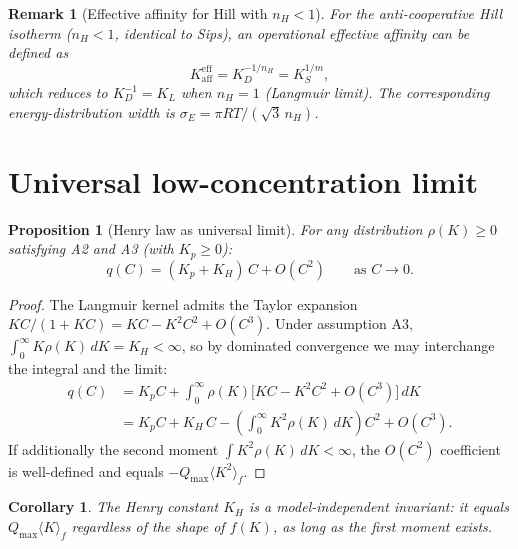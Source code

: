 \documentclass[12pt]{article}
\newtheorem{proposition}{Proposition}
\newtheorem{corollary}{Corollary}
\newtheorem{remark}{Remark}
\begin{document}
\begin{remark}[Effective affinity for Hill with $n_H < 1$]
For the anti-cooperative Hill isotherm ($n_H < 1$, identical to Sips),
an operational effective affinity can be defined as
\begin{equation}
  K_{\mathrm{aff}}^{\mathrm{eff}} = K_D^{-1/n_H} = K_S^{1/m},
\end{equation}
which reduces to $K_D^{-1} = K_L$ when $n_H = 1$ (Langmuir limit).
The corresponding energy-distribution width is
$\sigma_E = \pi RT / (\sqrt{3}\,n_H)$.
\end{remark}

\section{Universal low-concentration limit}
\label{sec:henry}

\begin{proposition}[Henry law as universal limit]
\label{prop:henry}
For any distribution $\rho(K)\ge 0$ satisfying A2 and A3 (with
$K_p\ge 0$):
\begin{equation}
  q(C) = (K_p + K_H)\,C + O(C^2) \qquad\text{as } C\to 0.
  \label{eq:henry_universal}
\end{equation}
\end{proposition}

\begin{proof}
The Langmuir kernel admits the Taylor expansion
$KC/(1+KC) = KC - K^2 C^2 + O(C^3)$.  Under assumption A3,
$\int_0^\infty K\rho(K)\,dK = K_H<\infty$, so by dominated
convergence we may interchange the integral and the limit:
\begin{align*}
  q(C) &= K_p C + \int_0^\infty \rho(K)\bigl[KC - K^2 C^2
          + O(C^3)\bigr]\,dK \\
       &= K_p C + K_H\,C - \left(\int_0^\infty K^2\rho(K)\,dK\right)C^2
          + O(C^3).
\end{align*}
If additionally the second moment
$\int K^2\rho(K)\,dK<\infty$, the $O(C^2)$ coefficient is
well-defined and equals $-Q_{\max}\langle K^2\rangle_f$.
\end{proof}

\begin{corollary}
The Henry constant $K_H$ is a model-independent invariant: it equals
$Q_{\max}\langle K\rangle_f$ regardless of the shape of $f(K)$,
as long as the first moment exists.
\end{corollary}
\end{document}
